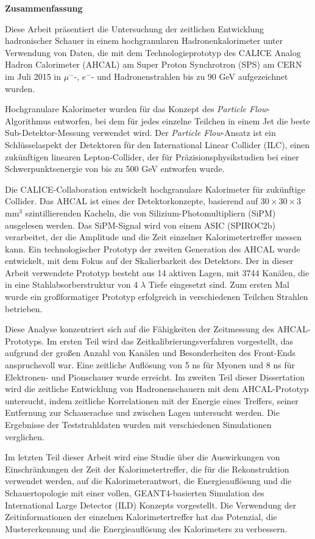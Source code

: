 \newpage
\thispagestyle{empty}
\begin{center}
{\bf Zusammenfassung}
\end{center}

Diese Arbeit präsentiert die Untersuchung der zeitlichen Entwicklung hadronischer Schauer in einem hochgranularen Hadronenkalorimeter unter Verwendung von Daten, die mit dem Technologieprototyp des CALICE Analog Hadron Calorimeter (AHCAL) am Super Proton Synchrotron (SPS) am CERN im Juli 2015 in $\mu^-$-, $e^-$- und Hadronenstrahlen bis zu 90 GeV aufgezeichnet wurden.

Hochgranulare Kalorimeter wurden f\"ur das Konzept des \textit{Particle Flow}-Algorithmus entworfen, bei dem f\"ur jedes einzelne Teilchen in einem Jet die beste Sub-Detektor-Messung verwendet wird. Der \textit{Particle Flow}-Ansatz ist ein Schlüsselaspekt der Detektoren f\"ur den International Linear Collider (ILC), einen zukünftigen linearen Lepton-Collider, der für Präzisionsphysikstudien bei einer Schwerpunktsenergie von bis zu 500 GeV entworfen wurde.

Die CALICE-Collaboration entwickelt hochgranulare Kalorimeter für zukünftige Collider. Das AHCAL ist eines der Detektorkonzepte, basierend auf $30\times30\times3$ mm$^3$ szintillierenden Kacheln, die von Silizium-Photomultipliern (SiPM) ausgelesen werden. Das SiPM-Signal wird von einem ASIC (SPIROC2b) verarbeitet, der die Amplitude und die Zeit einzelner Kalorimetertreffer messen kann. Ein technologischer Prototyp der zweiten Generation des AHCAL wurde entwickelt, mit dem Fokus auf der Skalierbarkeit des Detektors. Der in dieser Arbeit verwendete Prototyp besteht aus 14 aktiven Lagen, mit 3744 Kanälen, die in eine Stahlabsorberstruktur von 4 $\lambda$ Tiefe eingesetzt sind. Zum ersten Mal wurde ein großformatiger Prototyp erfolgreich in verschiedenen Teilchen Strahlen betrieben.

Diese Analyse konzentriert sich auf die Fähigkeiten der Zeitmessung des AHCAL-Prototyps. Im ersten Teil wird das Zeitkalibrierungsverfahren vorgestellt, das aufgrund der großen Anzahl von Kanälen und Besonderheiten des Front-Ends anspruchsvoll war. Eine zeitliche Auflösung von 5 ns für Myonen und 8 ns für Elektronen- und Pionschauer wurde erreicht. Im zweiten Teil dieser Dissertation wird die zeitliche Ent\-wick\-lung von Hadronenschauern mit dem AHCAL-Prototyp untersucht, indem zeitliche Korrelationen mit der Energie eines Treffers, seiner Entfernung zur Schauerachse und zwischen Lagen untersucht werden. Die Ergebnisse der Teststrahldaten wurden mit verschiedenen Simulationen verglichen.

Im letzten Teil dieser Arbeit wird eine Studie über die Auswirkungen von Einschr\"ankungen der Zeit der Kalorimetertreffer, die f\"ur die Rekonstruktion verwendet werden, auf die Kalorimeterantwort, die Energieauf\-lösung und die Schauertopologie mit einer vollen, GEANT4-basierten Simulation des International Large Detector (ILD) Konzepts vorgestellt. Die Verwendung der Zeitinformationen der einzelnen Kalorimetertreffer hat das Potenzial, die Mustererkennung und die Energieauflösung des Kalorimeters zu verbessern.

